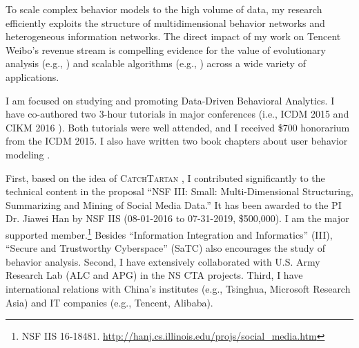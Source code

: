 \documentclass[10.5pt]{article}
\begin{document}
To scale complex behavior models to the high volume of data, my research efficiently exploits the structure of multidimensional behavior networks and heterogeneous information networks. The direct impact of my work on Tencent Weibo's revenue stream is compelling evidence for the value of evolutionary analysis (e.g., \cite{jiang2014scalable,jiang2014fema}) and scalable algorithms (e.g., \cite{jiang2014catchsync,jiang2016catchtartan}) across a wide variety of applications.

\vskip 0.05in
 I am focused on studying and promoting Data-Driven Behavioral Analytics. I have co-authored two 3-hour tutorials in major conferences (i.e., ICDM 2015 \cite{jiang2015behavior} and CIKM 2016 \cite{jiang2016data}). Both tutorials were well attended, and I received \$700 honorarium from the ICDM 2015. I also have written two book chapters about user behavior modeling \cite{jiang2016mining,jiang2016behavior}.

\vskip 0.05in
 First, based on the idea of \textsc{CatchTartan} \cite{jiang2016catchtartan}, I contributed significantly to the technical content in the proposal ``NSF III: Small: Multi-Dimensional Structuring, Summarizing and Mining of Social Media Data.'' It has been awarded to the PI Dr. Jiawei Han by NSF IIS (08-01-2016 to 07-31-2019, \$500,000). I am the major supported member.\footnote{NSF IIS 16-18481. \url{http://hanj.cs.illinois.edu/projs/social_media.htm}} Besides ``Information Integration and Informatics'' (III), ``Secure and Trustworthy Cyberspace'' (SaTC) also encourages the study of behavior analysis. Second, I have extensively collaborated with U.S. Army Research Lab (ALC and APG) in the NS CTA projects. Third, I have international relations with China's institutes (e.g., Tsinghua, Microsoft Research Asia) and IT companies (e.g., Tencent, Alibaba).

\vspace{-0.20in}
\small{
\begin{footnotesize}


\end{footnotesize}
}
\end{document}
